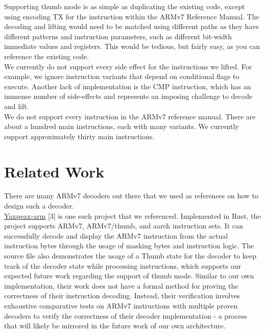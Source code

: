 \documentclass{article}
\begin{document}
\begin{multicols}{2}
Supporting thumb mode is as simple as duplicating the existing code, except using encoding TX for the instruction within the ARMv7 Reference Manual. The decoding and lifting would need to be matched using different paths as they have different patterns and instruction parameters, such as different bit-width immediate values and registers. This would be tedious, but fairly easy, as you can reference the existing code.\\

We currently do not support every side effect for the instructions we lifted. For example, we ignore instruction variants that depend on conditional flags to execute. Another lack of implementation is the CMP instruction, which has an immense number of side-effects and represents an imposing challenge to decode and lift.\\

We do not support every instruction in the ARMv7 reference manual. There are about a hundred main instructions, each with many variants. We currently support approximately thirty main instructions.

\section*{\centering Related Work}
\vspace{0.3cm}

There are many ARMv7 decoders out there that we used as references on how to design such a decoder.\\

\href{https://github.com/iximeow/yaxpeax-arm}{Yaxpeax-arm} [3] is one such project that we referenced. Implemented in Rust, the project supports ARMv7, ARMv7/thumb, and aarch instruction sets. It can successfully decode and display the ARMv7 instruction from the actual instruction bytes through the usage of masking bytes and instruction logic. The source file also demonstrates the usage of a Thumb state for the decoder to keep track of the decoder state while processing instructions, which supports our expected future work regarding the support of thumb mode. Similar to our own implementation, their work does not have a formal method for proving the correctness of their instruction decoding. Instead, their verification involves exhaustive comparative tests on ARMv7 instructions with multiple proven decoders to verify the correctness of their decoder implementation - a process that will likely be mirrored in the future work of our own architecture.\\


\end{multicols}
\end{document}
